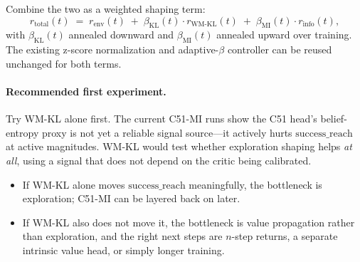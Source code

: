 \documentclass[11pt]{article}
\begin{document}
Combine the two as a weighted shaping term:
\[
  r_{\mathrm{total}}(t)
  \;=\;
  r_{\mathrm{env}}(t)
  \;+\;
  \beta_{\mathrm{KL}}(t)\cdot r_{\mathrm{WM\text{-}KL}}(t)
  \;+\;
  \beta_{\mathrm{MI}}(t)\cdot r_{\mathrm{info}}(t),
\]
with $\beta_{\mathrm{KL}}(t)$ annealed downward and $\beta_{\mathrm{MI}}(t)$
annealed upward over training. The existing z-score normalization and
adaptive-$\beta$ controller can be reused unchanged for both terms.

\paragraph{Recommended first experiment.}
Try WM-KL alone first. The current C51-MI runs show the C51 head's
belief-entropy proxy is not yet a reliable signal source---it actively hurts
$\mathrm{success\_reach}$ at active magnitudes. WM-KL would test whether
exploration shaping helps \emph{at all}, using a signal that does not
depend on the critic being calibrated.
\begin{itemize}
  \item If WM-KL alone moves $\mathrm{success\_reach}$ meaningfully, the
    bottleneck is exploration; C51-MI can be layered back on later.
  \item If WM-KL also does not move it, the bottleneck is value
    propagation rather than exploration, and the right next steps are
    $n$-step returns, a separate intrinsic value head, or simply longer
    training.
\end{itemize}
\end{document}
